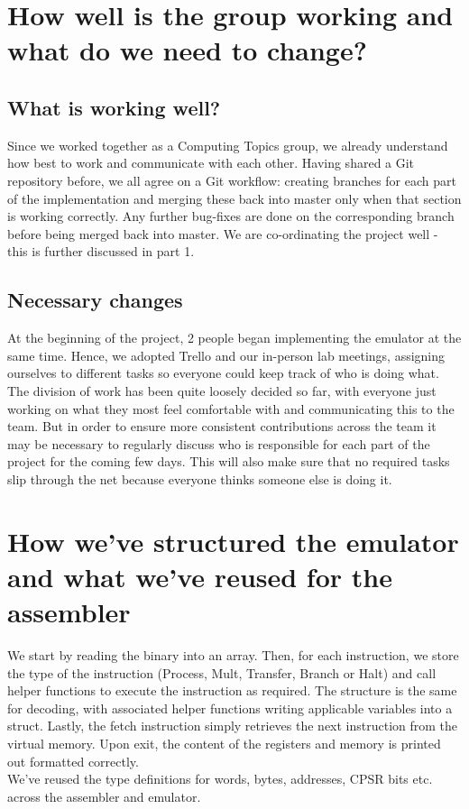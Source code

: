 \documentclass{article}
\begin{document}
\section{How well is the group working and what do we need to change?}
\subsection{What is working well?}
Since we worked together as a Computing Topics group, we already understand how best to work and communicate with each other. Having shared a Git repository before, we all agree on a Git workflow: creating branches for each part of the implementation and merging these back into master only when that section is working correctly. Any further bug-fixes are done on the corresponding branch before being merged back into master. We are co-ordinating the project well - this is further discussed in part 1.
\subsection{Necessary changes}
At the beginning of the project, 2 people began implementing the emulator at the same time. Hence, we adopted Trello and our in-person lab meetings, assigning ourselves to different tasks so everyone could keep track of who is doing what.\\

The division of work has been quite loosely decided so far, with everyone just working on what they most feel comfortable with and communicating this to the team. But in order to ensure more consistent contributions across the team it may be necessary to regularly discuss who is responsible for each part of the project for the coming few days. This will also make sure that no required tasks slip through the net because everyone thinks someone else is doing it.
\section{How we've structured the emulator and what we've reused for the assembler}
We start by reading the binary into an array. Then, for each instruction, we store the type of the instruction (Process, Mult, Transfer, Branch or Halt) and call helper functions to execute the instruction as required. The structure is the same for decoding, with associated helper functions writing applicable variables into a struct. Lastly, the fetch instruction simply retrieves the next instruction from the virtual memory. Upon exit, the content of the registers and memory is printed out formatted correctly.\\
We've reused the type definitions for words, bytes, addresses, CPSR bits etc. across the assembler and emulator.
\end{document}
